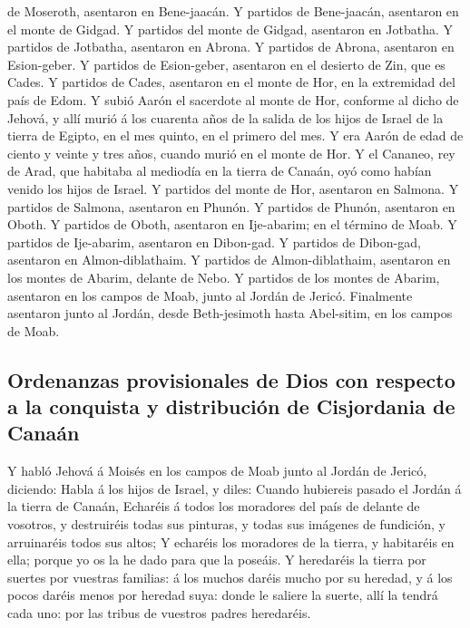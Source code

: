 de Moseroth, asentaron en Bene-jaacán.  Y partidos de
Bene-jaacán, asentaron en el monte de Gidgad.  Y partidos
del monte de Gidgad, asentaron en Jotbatha.  Y partidos de
Jotbatha, asentaron en Abrona.  Y partidos de Abrona,
asentaron en Esion-geber.  Y partidos de Esion-geber,
asentaron en el desierto de Zin, que es Cades.  Y partidos
de Cades, asentaron en el monte de Hor, en la extremidad del país de
Edom.  Y subió Aarón el sacerdote al monte de Hor, conforme
al dicho de Jehová, y allí murió á los cuarenta años de la salida de los
hijos de Israel de la tierra de Egipto, en el mes quinto, en el primero
del mes.  Y era Aarón de edad de ciento y veinte y tres
años, cuando murió en el monte de Hor.  Y el Cananeo, rey
de Arad, que habitaba al mediodía en la tierra de Canaán, oyó como
habían venido los hijos de Israel.  Y partidos del monte de
Hor, asentaron en Salmona.  Y partidos de Salmona,
asentaron en Phunón.  Y partidos de Phunón, asentaron en
Oboth.  Y partidos de Oboth, asentaron en Ije-abarim; en el
término de Moab.  Y partidos de Ije-abarim, asentaron en
Dibon-gad.  Y partidos de Dibon-gad, asentaron en
Almon-diblathaim.  Y partidos de Almon-diblathaim,
asentaron en los montes de Abarim, delante de Nebo.  Y
partidos de los montes de Abarim, asentaron en los campos de Moab, junto
al Jordán de Jericó.  Finalmente asentaron junto al Jordán,
desde Beth-jesimoth hasta Abel-sitim, en los campos de Moab.

\hypertarget{ordenanzas-provisionales-de-dios-con-respecto-a-la-conquista-y-distribuciuxf3n-de-cisjordania-de-canauxe1n}{%
\subsection{Ordenanzas provisionales de Dios con respecto a la conquista
y distribución de Cisjordania de
Canaán}\label{ordenanzas-provisionales-de-dios-con-respecto-a-la-conquista-y-distribuciuxf3n-de-cisjordania-de-canauxe1n}}

 Y habló Jehová á Moisés en los campos de Moab junto al
Jordán de Jericó, diciendo:  Habla á los hijos de Israel, y
diles: Cuando hubiereis pasado el Jordán á la tierra de Canaán,
 Echaréis á todos los moradores del país de delante de
vosotros, y destruiréis todas sus pinturas, y todas sus imágenes de
fundición, y arruinaréis todos sus altos;  Y echaréis los
moradores de la tierra, y habitaréis en ella; porque yo os la he dado
para que la poseáis.  Y heredaréis la tierra por suertes
por vuestras familias: á los muchos daréis mucho por su heredad, y á los
pocos daréis menos por heredad suya: donde le saliere la suerte, allí la
tendrá cada uno: por las tribus de vuestros padres heredaréis.

